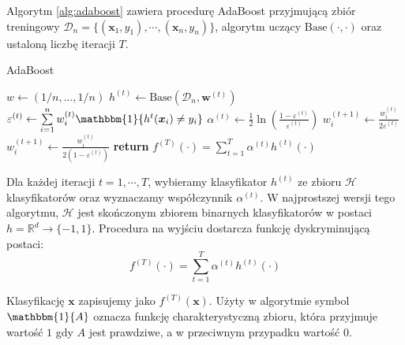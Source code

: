 Algorytm \ref{alg:adaboost} zawiera procedurę AdaBoost przyjmującą zbiór treningowy $\mathcal{D}_n=\{(\boldsymbol{x}_1, y_1),\cdots,\allowbreak(\boldsymbol{x}_n, y_n)\}$, algorytm uczący $\text{Base}(\cdot, \cdot)$ oraz ustaloną liczbę iteracji $T$.\cite{KEGL09}

\begin{algorithm}
	\caption{AdaBoost}
	\label{alg:adaboost}
	\begin{algorithmic}[1]
			\State $w \gets (1/n, ..., 1/n)$ 
				\State $h^{(t)} \gets \text{Base}(\mathcal{D}_n, \boldsymbol{w}^{(t)})$ 
				\State $\varepsilon^{(t)} \gets \sum\limits_{i = 1}^n w_i^{(t)} \mathbbm{1} \{ h^{t}(\boldsymbol{x}_i) \neq y_i \}$ 
				\State $\alpha^{(t)} \gets \frac{1}{2} \ln( \frac{1-\varepsilon^{(t)}}{\varepsilon^{(t)}} )$ 
				 
					 
						\State $w_i^{(t+1)} \leftarrow \frac{w_i^{(t)}}{2\varepsilon^{(t)}}$ 
					\Else {}
						\State $w_i^{(t+1)} \leftarrow \frac{w_i^{(t)}}{ 2(1 - \varepsilon^{(t)} )}$ 
					\EndIf
				\EndFor
			\EndFor
			\State \textbf{return} $f^{(T)}(\cdot) = \sum\limits_{t = 1}^T \alpha^{(t)}h^{(t)}(\cdot)$ 
		\EndProcedure
    \end{algorithmic}
\end{algorithm}

Dla każdej iteracji $t = 1, \cdots, T$, wybieramy klasyfikator $h^{(t)}$ ze zbioru $\mathcal{H}$ klasyfikatorów oraz wyznaczamy współczynnik $\alpha^{(t)}$. W najprostszej wersji tego algorytmu, $\mathcal{H}$ jest skończonym zbiorem binarnych klasyfikatorów w postaci $h = \mathbb{R}^d \rightarrow \{ -1, 1 \}$. Procedura na wyjściu dostarcza funkcję dyskryminującą postaci:
\begin{equation} 
\label{adaboost-discriminant} 
f^{(T)}(\cdot) = \sum_{t=1}^T \alpha^{(t)} h^{(t)}(\cdot)
\end{equation}

Klasyfikację $\boldsymbol{x}$ zapisujemy jako $f^{(T)}(\boldsymbol{x})$. Użyty w algorytmie symbol $\mathbbm{1}\{A\}$ oznacza funkcję charakterystyczną zbioru, która przyjmuje wartość $1$ gdy $A$ jest prawdziwe, a w przeciwnym przypadku wartość $0$.

